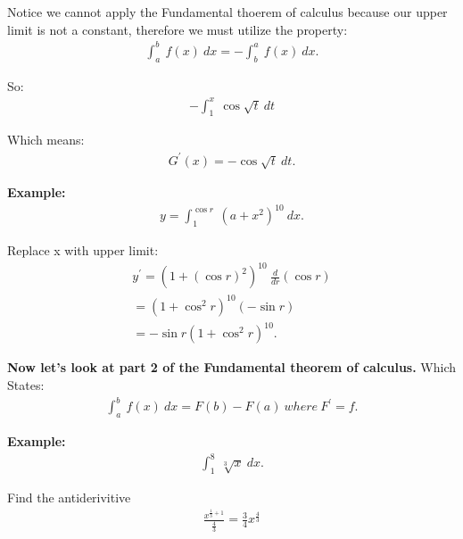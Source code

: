 \documentclass{report}
\begin{document}
\bigbreak \noindent \bigbreak \noindent
Notice we cannot apply the Fundamental thoerem of calculus because our upper limit is not a constant, therefore we must utilize the property:
\begin{align*}
  \int_{a}^{b}\ f(x)\ dx = -\int_{b}^{a}\ f(x)\ dx
.\end{align*}

\bigbreak \noindent
So:
\begin{align*}
  -\int_{1}^{x}\ \cos{\sqrt{t}}\ dt  
\end{align*}

\bigbreak \noindent \bigbreak \noindent
Which means:
\begin{align*}
  \boxed{G^{\prime}(x) = -\cos{\sqrt{t}}\ dt}
.\end{align*}

\bigbreak \noindent 
\begin{mdframed}
  \textbf{Example: }
  \begin{align*}
    y = \int_{1}^{\cos{r}}\ (a+x^{2})^{10}\ dx
  .\end{align*}
\end{mdframed}

\bigbreak \noindent \bigbreak \noindent
Replace x with upper limit:
\begin{align*}
  y^{\prime} = (1+(\cos{r})^{2})^{10}\ \frac{d}{dr}(\cos{r}) \\
  = (1+\cos^{2}{r})^{10}(-\sin{r}) \\
  \boxed{= -\sin{r}(1+\cos^{2}{r})^{10}}
.\end{align*}

\bigbreak \noindent \bigbreak \noindent
\begin{mdframed}
  \textbf{Now let's look at part 2 of the Fundamental theorem of calculus.}
  \bigbreak \noindent 
  Which States:
  \begin{align*}
    \int_{a}^{b}\ f(x)\ dx = F(b) - F(a)\ where\ F^{\prime} = f
  .\end{align*}
\end{mdframed}

\pagebreak \bigbreak \noindent
\begin{mdframed}
  \textbf{Example: }
  \begin{align*}
    \int_{1}^{8}\ \sqrt[3]{x}\ dx
  .\end{align*} 
\end{mdframed}


\bigbreak \noindent
Find the antiderivitive
\begin{align*}
  \frac{x^{\frac{1}{3}+1}}{\frac{4}{3}} 
  = \frac{3}{4}x^{\frac{4}{3}}
\end{align*}
\end{document}
